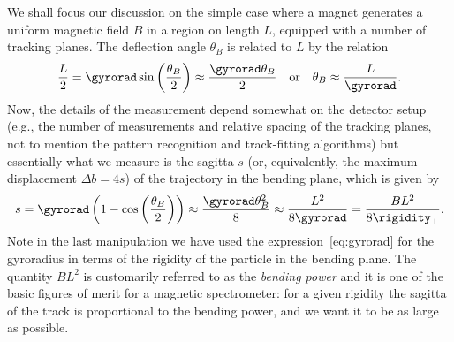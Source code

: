 We shall focus our discussion on the simple case where a magnet generates a
uniform magnetic field $B$ in a region on length $L$, equipped with a number of
tracking planes. The deflection angle $\theta_B$ is related
to $L$ by the relation
\begin{align*}
  \frac{L}{2} = \gyrorad \sin\left(\frac{\theta_B}{2}\right) \approx
  \frac{\gyrorad \theta_B}{2} \quad\text{or}\quad
  \theta_B \approx \frac{L}{\gyrorad}.
\end{align*}
Now, the details of the measurement depend somewhat on the detector setup (e.g.,
the number of measurements and relative spacing of the tracking planes, not to
mention the pattern recognition and track-fitting algorithms) but essentially what
we measure is the sagitta $s$ (or, equivalently, the maximum displacement
$\Delta b = 4s$) of the trajectory in the bending plane, which is given by
\begin{align*}
  s = \gyrorad \left(1 - \cos\left(\frac{\theta_B}{2}\right)\right) \approx
  \frac{\gyrorad \theta_B^2}{8} \approx \frac{L^2}{8\gyrorad} =
  \frac{B L^2}{8 \rigidity_\perp}.
\end{align*}
Note in the last manipulation we have used the expression~\ref{eq:gyrorad} for the
gyroradius in terms of the rigidity of the particle in the bending plane.
The quantity $B L^2$ is customarily referred to as the \emph{bending power} and it
is one of the basic figures of merit for a magnetic spectrometer: for a given
rigidity the sagitta of the track is proportional to the bending power, and
we want it to be as large as possible.

